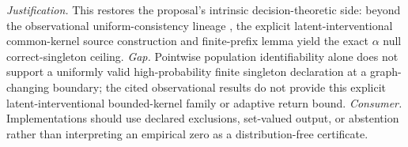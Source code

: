 \documentclass{article}
\begin{document}
\par\smallskip\noindent \textit{Justification.} This restores the proposal's intrinsic decision-theoretic side: beyond the observational uniform-consistency lineage \cite{robins2003uniform,zhang2003strong}, the explicit latent-interventional common-kernel source construction and finite-prefix lemma yield the exact \(\alpha\) null correct-singleton ceiling. \textit{Gap.} Pointwise population identifiability alone does not support a uniformly valid high-probability finite singleton declaration at a graph-changing boundary; the cited observational results do not provide this explicit latent-interventional bounded-kernel family or adaptive return bound. \textit{Consumer.} Implementations should use declared exclusions, set-valued output, or abstention rather than interpreting an empirical zero as a distribution-free certificate.
\end{document}

